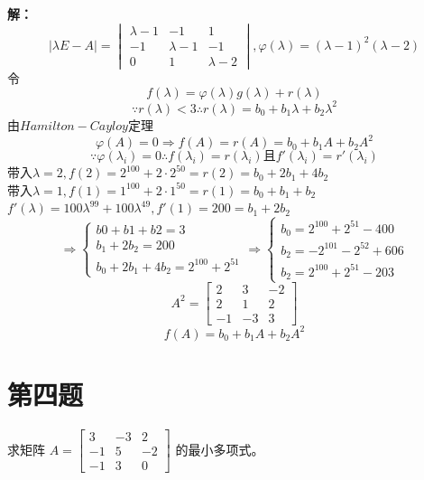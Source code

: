 \documentclass{article}
\begin{document}
\textbf{解：}
\[\mid \lambda E - A \mid= \begin{vmatrix} \lambda - 1 & -1 & 1 \\ -1 & \lambda-1 & -1 \\ 0 & 1 & \lambda-2\end{vmatrix},
\varphi(\lambda) = (\lambda - 1)^2(\lambda - 2)\]
令\[f(\lambda) = \varphi(\lambda)g(\lambda) + r(\lambda)\]
\[\because r(\lambda) < 3 \therefore r(\lambda) = b_0 + b_1\lambda + b_2\lambda^2\]
由$Hamilton-Cayloy$定理 \\
\[\varphi(A)=0 \Rightarrow f(A) = r(A) = b_0 + b_1A + b_2A^2\]
\[\because \varphi(\lambda_i)=0 \therefore f(\lambda_i) = r(\lambda_i)\text{且}f'(\lambda_i)=r'(\lambda_i)\]
带入$\lambda = 2,f(2)=2^{100} + 2 · 2^{50} = r(2) = b_0 + 2b_1 + 4b_2$ \\
带入$\lambda = 1,f(1)=1^{100} + 2 · 1^{50} = r(1) = b_0 + b_1 + b_2$ \\
$f'(\lambda)=100\lambda^99 + 100\lambda^49, f'(1)=200 = b_1 + 2b_2$ \\
\[\Rightarrow \begin{cases}b0 + b1 + b2 = 3 \\ b_1 + 2b_2 = 200 \\ b_0 + 2b_1 + 4b_2 = 2^{100} + 2^{51}\end{cases}
\Rightarrow \begin{cases}b_0 = 2^{100} + 2^{51} - 400 \\ b_2 = -2^{101} - 2^{52} + 606 \\ b_2 = 2^{100} + 2^{51} - 203\end{cases}\]
\[A^ 2 = \begin{bmatrix}2 & 3 & -2 \\ 2 & 1 & 2 \\ -1 & -3 & 3\end{bmatrix}\]
\[f(A) = b_0 + b_1A + b_2A^2\]

\newpage
\section{第四题}\noindent
求矩阵 $A = \begin{bmatrix}
3 & -3 & 2 \\
-1 & 5 & -2 \\
-1 & 3 & 0
\end{bmatrix}$ 的最小多项式。
\end{document}
